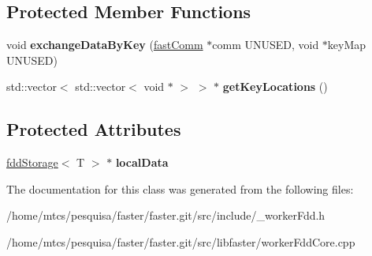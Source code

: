 \subsection*{Protected Member Functions}
\begin{DoxyCompactItemize}
\item 
\hypertarget{classfaster_1_1workerFddCore_a62b8e24206e353c24404145f63f65d12}{}void {\bfseries exchange\+Data\+By\+Key} (\hyperlink{classfaster_1_1fastComm}{fast\+Comm} $\ast$comm U\+N\+U\+S\+E\+D, void $\ast$key\+Map U\+N\+U\+S\+E\+D)\label{classfaster_1_1workerFddCore_a62b8e24206e353c24404145f63f65d12}

\item 
\hypertarget{classfaster_1_1workerFddCore_a8b82124f0cf058974f73df7521a1aa80}{}std\+::vector$<$ std\+::vector$<$ void $\ast$ $>$ $>$ $\ast$ {\bfseries get\+Key\+Locations} ()\label{classfaster_1_1workerFddCore_a8b82124f0cf058974f73df7521a1aa80}

\end{DoxyCompactItemize}
\subsection*{Protected Attributes}
\begin{DoxyCompactItemize}
\item 
\hypertarget{classfaster_1_1workerFddCore_aba24c5db034dd1b8235b9ad4483c5e0e}{}\hyperlink{classfaster_1_1fddStorage}{fdd\+Storage}$<$ T $>$ $\ast$ {\bfseries local\+Data}\label{classfaster_1_1workerFddCore_aba24c5db034dd1b8235b9ad4483c5e0e}

\end{DoxyCompactItemize}


The documentation for this class was generated from the following files\+:\begin{DoxyCompactItemize}
\item 
/home/mtcs/pesquisa/faster/faster.\+git/src/include/\+\_\+worker\+Fdd.\+h\item 
/home/mtcs/pesquisa/faster/faster.\+git/src/libfaster/worker\+Fdd\+Core.\+cpp\end{DoxyCompactItemize}
